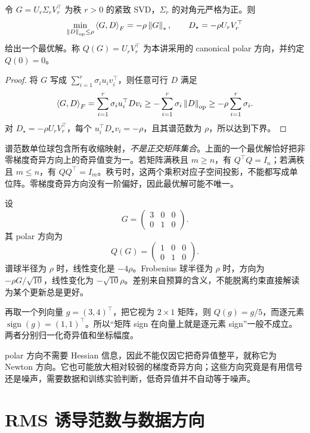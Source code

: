 \begin{theorem}[谱范数球内的最优线性方向]
令 $G=U_r\Sigma_rV_r^\top$ 为秩 $r>0$ 的紧致 SVD，$\Sigma_r$ 的对角元严格为正。则
\begin{equation}
 \min_{\left\lVert D\right\rVert_{\rm op}\leq\rho}\left\langle G,D\right\rangle_F
 =-\rho\left\lVert G\right\rVert_*,
 \qquad
 D_\star=-\rho U_rV_r^\top
 \label{l4:polar-optimum}
\end{equation}
给出一个最优解。称 $Q(G)=U_rV_r^\top$ 为本讲采用的 canonical polar 方向，并约定 $Q(0)=0$。
\end{theorem}
\begin{proof}
将 $G$ 写成 $\sum_{i=1}^r\sigma_i u_i v_i^\top$，则任意可行 $D$ 满足
\[
 \left\langle G,D\right\rangle_F=\sum_{i=1}^r\sigma_i u_i^\top Dv_i
 \geq-\sum_{i=1}^r\sigma_i\left\lVert D\right\rVert_{\rm op}
 \geq-\rho\sum_{i=1}^r\sigma_i.
\]
对 $D_\star=-\rho U_rV_r^\top$，每个 $u_i^\top D_\star v_i=-\rho$，且其谱范数为 $\rho$，所以达到下界。
\end{proof}

谱范数单位球包含所有收缩映射，\emph{不是正交矩阵集合}。上面的一个最优解恰好把非零梯度奇异方向上的奇异值变为一。若矩阵满秩且 $m\geq n$，有 $Q^\top Q=I_n$；若满秩且 $m\leq n$，有 $QQ^\top=I_m$。秩亏时，这两个乘积对应子空间投影，不能都写成单位阵。零梯度奇异方向没有一阶偏好，因此最优解可能不唯一。

\begin{example}
设
\[
 G=\begin{pmatrix}3&0&0\\0&1&0\end{pmatrix}.
\]
其 polar 方向为
\[
 Q(G)=\begin{pmatrix}1&0&0\\0&1&0\end{pmatrix}.
\]
谱球半径为 $\rho$ 时，线性变化是 $-4\rho$。Frobenius 球半径为 $\rho$ 时，方向为 $-\rho G/\sqrt{10}$，线性变化为 $-\sqrt{10}\rho$。差别来自预算的含义，不能脱离约束直接解读为某个更新总是更好。

再取一个列向量 $g=(3,4)^\top$，把它视为 $2\times1$ 矩阵，则 $Q(g)=g/5$，而逐元素 $\operatorname{sign}(g)=(1,1)^\top$。所以“矩阵 sign 在向量上就是逐元素 sign”一般不成立。两者分别归一化奇异值和坐标幅度。
\end{example}

polar 方向不需要 Hessian 信息，因此不能仅因它把奇异值整平，就称它为 Newton 方向。它也可能放大相对较弱的梯度奇异方向；这些方向究竟是有用信号还是噪声，需要数据和训练实验判断，低奇异值并不自动等于噪声。

\section{RMS 诱导范数与数据方向}
\label{l4:rms-induced}

